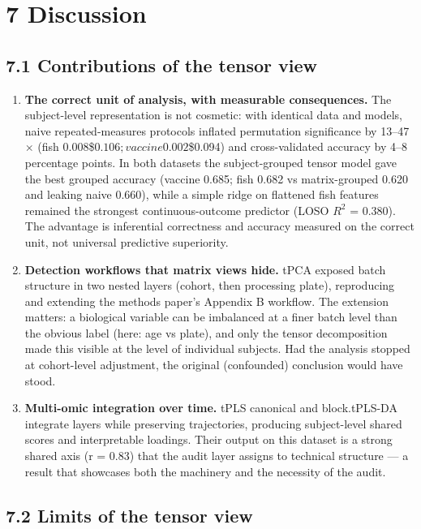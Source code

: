 \documentclass[
]{article}
\providecommand{\tightlist}{%
  \setlength{\itemsep}{0pt}\setlength{\parskip}{0pt}}
\begin{document}
\section{7 Discussion}\label{discussion}

\subsection{7.1 Contributions of the tensor
view}\label{contributions-of-the-tensor-view}

\begin{enumerate}
\def\labelenumi{\arabic{enumi}.}
\tightlist
\item
  \textbf{The correct unit of analysis, with measurable consequences.}
  The subject-level representation is not cosmetic: with identical data
  and models, naive repeated-measures protocols inflated permutation
  significance by 13--47\(\times\) (fish
  0.008\$\to\(0.106; vaccine 0.002\)\to\$0.094) and cross-validated
  accuracy by 4--8 percentage points. In both datasets the
  subject-grouped tensor model gave the best grouped accuracy (vaccine
  0.685; fish 0.682 vs matrix-grouped 0.620 and leaking naive 0.660),
  while a simple ridge on flattened fish features remained the strongest
  continuous-outcome predictor (LOSO \(R^2\) = 0.380). The advantage is
  inferential correctness and accuracy measured on the correct unit, not
  universal predictive superiority.
\item
  \textbf{Detection workflows that matrix views hide.} tPCA exposed
  batch structure in two nested layers (cohort, then processing plate),
  reproducing and extending the methods paper's Appendix B workflow. The
  extension matters: a biological variable can be imbalanced at a finer
  batch level than the obvious label (here: age vs plate), and only the
  tensor decomposition made this visible at the level of individual
  subjects. Had the analysis stopped at cohort-level adjustment, the
  original (confounded) conclusion would have stood.
\item
  \textbf{Multi-omic integration over time.} tPLS canonical and
  block.tPLS-DA integrate layers while preserving trajectories,
  producing subject-level shared scores and interpretable loadings.
  Their output on this dataset is a strong shared axis (r = 0.83) that
  the audit layer assigns to technical structure --- a result that
  showcases both the machinery and the necessity of the audit.
\end{enumerate}

\subsection{7.2 Limits of the tensor
view}\label{limits-of-the-tensor-view}
\end{document}
